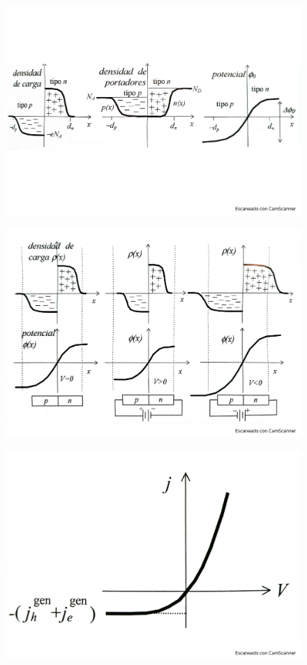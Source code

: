 \begin{figure}[h!] \centering
	\includegraphics[scale=0.5]{Cuerpo/Ch_09/Fotos libro 6.pdf}
	\caption{}
	\label{Fig:09-06}
\end{figure}
\begin{figure}[h!] \centering
	\includegraphics[scale=0.5]{Cuerpo/Ch_09/Fotos libro 7.pdf}
	\caption{}
	\label{Fig:09-07}
\end{figure}
\begin{figure}[h!] \centering
	\includegraphics[scale=0.5]{Cuerpo/Ch_09/Fotos libro 8.pdf}
	\caption{}
	\label{Fig:09-08}
\end{figure}